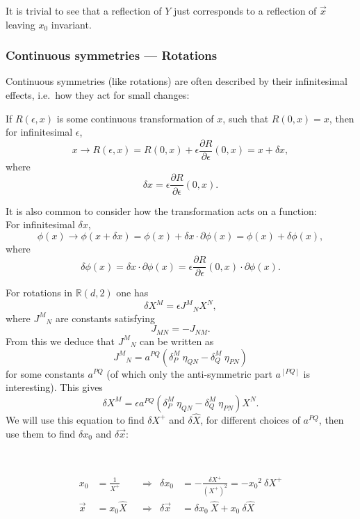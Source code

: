 It is trivial to see that a reflection of $Y$ just corresponds to a reflection of $\vec{x}$ leaving $x_0$ invariant.

\subsubsection{Continuous symmetries --- Rotations}
Continuous symmetries (like rotations) are often described by their infinitesimal effects, i.e.\ how they act for small changes:

If $R(\epsilon,x)$ is some continuous transformation of $x$, such that $R(0,x)=x$, then for infinitesimal $\epsilon$,
$$x \rightarrow R(\epsilon,x) = R(0,x) + \epsilon \frac{\partial R}{\partial\epsilon}(0,x) = x + \delta x,$$
where
$$\delta x = \epsilon \frac{\partial R}{\partial\epsilon}(0,x).$$

It is also common to consider how the transformation acts on a function:\\
For infinitesimal $\delta x$,
$$\phi(x) \rightarrow \phi(x+\delta x) = \phi(x) + \delta x \cdot \partial\phi(x) = \phi(x) + \delta\phi(x),$$
where
$$\delta\phi(x) = \delta x \cdot \partial\phi(x) = \epsilon \frac{\partial R}{\partial\epsilon}(0,x) \cdot \partial\phi(x).$$

For rotations in $\mathbb{R}(d,2)$ one has
$$\delta X^M = \epsilon J^M{}_N X^N,$$
where $J^M{}_N$ are constants satisfying
$$J_{MN} = -J_{NM}.$$
From this we deduce that $J^M{}_N$ can be written as
$$J^M{}_N = a^{PQ} (\delta^M_P\: \eta_{QN} - \delta^M_Q\: \eta_{PN})
$$
for some constants $a^{PQ}$ (of which only the anti-symmetric part $a^{[PQ]}$ is interesting).
This gives
$$\delta X^M = \epsilon a^{PQ} (\delta^M_P\: \eta_{QN} - \delta^M_Q\: \eta_{PN}) X^N.$$
We will use this equation to find $\delta X^+$ and $\delta\hat{X}$, for different choices of $a^{PQ}$, then use them to find $\delta x_0$ and $\delta \vec{x}$:

\\

\begin{align*}
x_0 &= \frac{1}{X^+} &&\Rightarrow& \delta x_0 &= -\frac{\delta X^+}{(X^+)^2} = -{x_0}^2\: \delta X^+ \\
\vec{x} &= x_0 \hat{X} &&\Rightarrow& \delta\vec{x} &= \delta x_0\: \hat{X} + x_0\: \delta\hat{X}
\end{align*}

